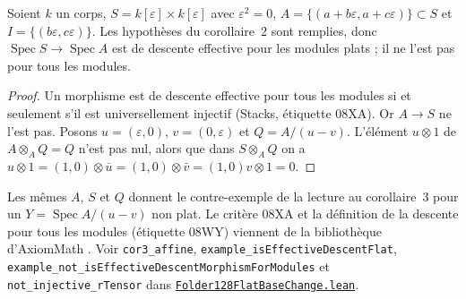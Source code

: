 \begin{encadre}
\begin{contrexemple}
Soient $k$ un corps, $S = k[\varepsilon] \times k[\varepsilon]$ avec $\varepsilon^2 = 0$, $A = \{(a + b\varepsilon, a + c\varepsilon)\} \subset S$ et $I = \{(b\varepsilon, c\varepsilon)\}$. Les hypothèses du corollaire~2 sont remplies, donc $\operatorname{Spec} S \to \operatorname{Spec} A$ est de descente effective pour les modules plats ; il ne l'est pas pour tous les modules.
\end{contrexemple}
\end{encadre}

\begin{proof}
Un morphisme est de descente effective pour tous les modules si et seulement s'il est universellement injectif (Stacks, étiquette 08XA). Or $A \to S$ ne l'est pas. Posons $u = (\varepsilon, 0)$, $v = (0, \varepsilon)$ et $Q = A/(u - v)$. L'élément $u \otimes 1$ de $A \otimes_A Q = Q$ n'est pas nul, alors que dans $S \otimes_A Q$ on a $u \otimes 1 = (1, 0) \otimes \bar u = (1, 0) \otimes \bar v = (1, 0)v \otimes 1 = 0$.
\end{proof}

\noindent Les mêmes $A$, $S$ et $Q$ donnent le contre-exemple de la lecture au corollaire~3 pour un $Y = \operatorname{Spec} A/(u - v)$ non plat. Le critère 08XA et la définition de la descente pour tous les modules (étiquette 08WY) viennent de la bibliothèque d'AxiomMath \cite{axiomstacks}. Voir \texttt{cor3\_affine}, \texttt{example\_isEffectiveDescentFlat}, \texttt{example\_not\_isEffectiveDescentMorphismForModules} et \texttt{not\_injective\_rTensor} dans \href{\leanblobmain/AlgebraicGeometry/Folder128FlatBaseChange.lean}{\texttt{Folder128FlatBaseChange.\allowbreak{}lean}}.

